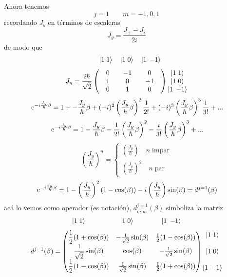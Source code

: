 \documentclass[10pt,oneside]{CBFT_book}
\begin{document}
Ahora tenemos 
\[
	j=1 \qquad m = -1,0,1
\]
recordando $J_y$ en términos de escaleras
\[
	J_y = \frac{J_+ - J_i}{2i}
\]
de modo que 
\[
	\begin{matrix} \quad \Ket{1\;1} \quad \Ket{1\;0} \quad \Ket{1\;-\kern-1mm 1} \end{matrix}
\]
\[
	J_y = \frac{i\hbar}{\sqrt{2}} \begin{pmatrix}
	                               \quad 0 & \quad -1 \quad & 0 \quad \\
	                               \quad 1 & \quad 0 \quad & -1 \quad \\
	                               \quad 0 & \quad 1 \quad & 0 \quad
	                              \end{pmatrix} 
	     \begin{matrix}  \Ket{1\;1} \\ \Ket{1\;0} \\ \Ket{1\;-\kern-1mm 1} \end{matrix}
\]
\[
	\:\mathrm{e}^{-i\frac{J_y}{\hbar}\beta} = 1 + -\frac{J_y}{\hbar}\beta + 
		(-i)^2\left(\frac{J_y}{\hbar}\beta\right)^2\frac{1}{2!} + 
		(-i)^3\left(\frac{J_y}{\hbar}\beta\right)^3\frac{1}{3!} + ...
\]
\[
	\:\mathrm{e}^{-i\frac{J_y}{\hbar}\beta} = 1 - \frac{J_y}{\hbar}\beta -
		\frac{1}{2!} \left(\frac{J_y}{\hbar}\beta\right)^2 -
		\frac{i}{3!}\left(\frac{J_y}{\hbar}\beta\right)^3 + ...
\]
\[
	\left( \frac{J_y}{\hbar} \right)^n = \begin{cases}
	                                      \left( \frac{J_y}{\hbar} \right) \quad n \; \text{impar} \\
	                                      \left( \frac{J_y}{\hbar} \right)^2 \quad n \; \text{par}
	                                     \end{cases}
\]
\[
	\:\mathrm{e}^{-i\frac{J_y}{\hbar}\beta} = 1 -  \left( \frac{J_y}{\hbar} \right)^2 (1-\cos(\beta)) -
	i \left( \frac{J_y}{\hbar} \right) \sin(\beta)  = d^{j=1}(\beta)
\]
acá lo vemos como operador (es notación), $d_{m'm}^{j=1}(\beta)$ simboliza la matriz
\[
	\begin{matrix} \Ket{1\;1} \qquad\qquad\quad \Ket{1\;0} \qquad\qquad \Ket{1\;-\kern-1mm 1} \end{matrix}
\]
\[
	d^{j=1}(\beta) =
	\begin{pmatrix}
	\displaystyle \frac{1}{2}( 1 + \cos(\beta)) & -\frac{1}{\sqrt{2}}\sin(\beta) & \frac{1}{2}( 1 - 
\cos(\beta) ) \\
	\displaystyle{\frac{1}{\sqrt{2}}\sin(\beta)} & \cos(\beta) & -\frac{1}{\sqrt{2}}\sin(\beta) \\
	\displaystyle{\frac{1}{2}(1 - \cos(\beta))} & \frac{1}{\sqrt{2}}\sin(\beta) & \frac{1}{2}  ( 1 + 
\cos(\beta) )
	\end{pmatrix} \begin{matrix} \Ket{1\;1} \\ \\ \Ket{1\;0} \\ \\ \Ket{1\;-\kern-1mm 1} \end{matrix}
\]
\end{document}
